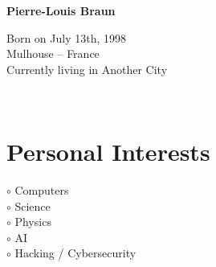 \documentclass[a4paper,10pt]{article}
\begin{document}
\thispagestyle{empty}

\begin{adjustbox}{valign=t}
\begin{minipage}{0.3\textwidth} %
\begin{center}

\MySkip 	%

\raggedright
{\LARGE \bfseries Pierre-Louis Braun}

\MySkip 	%

\begin{spacing}{1.0}
Born on July 13th, 1998\\
Mulhouse -- France\\
Currently living in Another City\\
\end{spacing}

\MySkip 	%

\textcolor{ColorTwo}{\faEnvelopeO}
 \\
\vspace{-1\baselineskip}

\end{center}

\vfill

\section*{Personal Interests}
\raggedright
\begin{spacing}{1.0}
\textcolor{ColorOne}{$\circ$} Computers\\
\textcolor{ColorOne}{$\circ$} Science\\
\textcolor{ColorOne}{$\circ$} Physics\\
\textcolor{ColorOne}{$\circ$} AI\\
\textcolor{ColorOne}{$\circ$} Hacking / Cybersecurity\\
\end{spacing}


\end{minipage}
\end{adjustbox}
\end{document}
